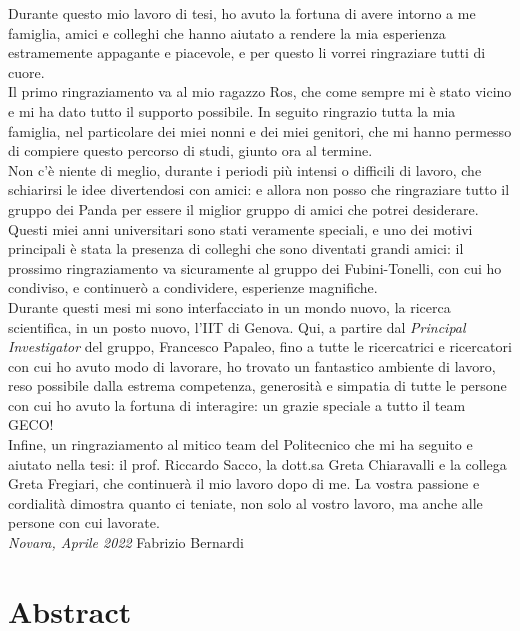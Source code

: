 \documentclass[12pt, a4paper]{report}
\begin{document}
	Durante questo mio lavoro di tesi, ho avuto la fortuna di avere intorno a me famiglia, amici e colleghi che hanno aiutato a rendere la mia esperienza estramemente appagante e piacevole, e per questo li vorrei ringraziare tutti di cuore.\\
	Il primo ringraziamento va al mio ragazzo Ros, che come sempre mi è stato vicino e mi ha dato tutto il supporto possibile.  In seguito ringrazio tutta la mia famiglia, nel particolare dei miei nonni e dei miei genitori, che mi hanno permesso di compiere questo percorso di studi, giunto ora al termine.\\
	Non c'è niente di meglio, durante i periodi più intensi o difficili di lavoro, che schiarirsi le idee divertendosi con amici: e allora non posso che ringraziare tutto il gruppo dei Panda per essere il miglior gruppo di amici che potrei desiderare.\\
	Questi miei anni universitari sono stati veramente speciali, e uno dei motivi principali è stata la presenza di colleghi che sono diventati grandi amici: il prossimo ringraziamento va sicuramente al gruppo dei Fubini-Tonelli, con cui ho condiviso, e continuerò a condividere, esperienze magnifiche. \\
	Durante questi mesi mi sono interfacciato in un mondo nuovo, la ricerca scientifica, in un posto nuovo, l'IIT di Genova. Qui, a partire dal \textit{Principal Investigator} del gruppo, Francesco Papaleo, fino a tutte le ricercatrici e ricercatori con cui ho avuto modo di lavorare, ho trovato un fantastico ambiente di lavoro, reso possibile dalla estrema competenza, generosità e simpatia di tutte le persone con cui ho avuto la fortuna di interagire: un grazie speciale a tutto il team GECO!\\
	Infine, un ringraziamento al mitico team del Politecnico che mi ha seguito e aiutato nella tesi: il prof. Riccardo Sacco, la dott.sa Greta Chiaravalli e la collega Greta Fregiari, che continuerà il mio lavoro dopo di me. La vostra passione e cordialità dimostra quanto ci teniate, non solo al vostro lavoro, ma anche alle persone con cui lavorate.\\

\textit{Novara, Aprile 2022} \hspace{5 cm} Fabrizio Bernardi


	
	
	\chapter*{Abstract}
	
\end{document}
